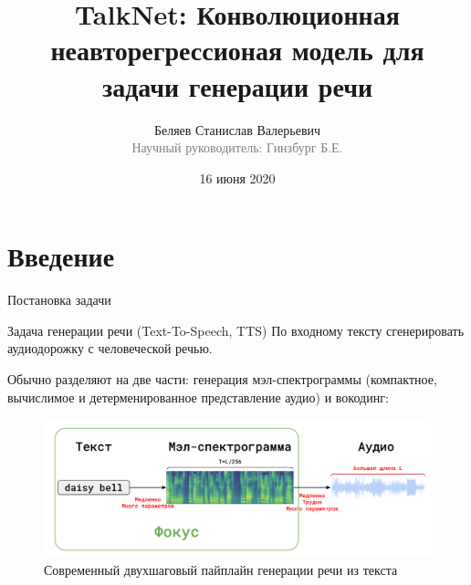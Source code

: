 

\title[Генерация речи]{TalkNet: Конволюционная неавторегрессионая модель для задачи генерации речи}
\author[Беляев Станислав]{Беляев Станислав Валерьевич\\\footnotesize\textcolor{gray}{Научный руководитель: Гинзбург Б.Е.}{}}
\date{16 июня 2020}



\begin{frame}
\titlepage
\end{frame}

\section{Введение}

\begin{frame}{Постановка задачи}
\begin{block}{Задача генерации речи (Text-To-Speech, TTS)}
    По входному тексту сгенерировать аудиодорожку с человеческой речью.
\end{block}
Обычно разделяют на две части: генерация мэл-спектрограммы (компактное, вычислимое и детерменированное представление аудио) и вокодинг:
\begin{figure}[H]
\centering
\includegraphics[width=1.0\textwidth]{images/tts-pipeline-rus.png}
\caption{Современный двухшаговый пайплайн генерации речи из текста}
\end{figure}
\end{frame}

